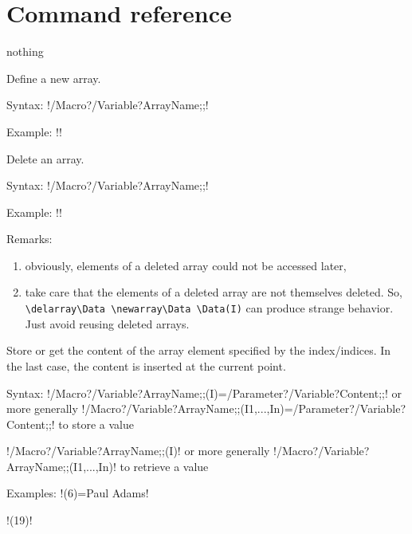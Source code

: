 \documentclass{article}
\newenvironment{Description}[1]{%
\begin{list}{nothing}{\setlength{\leftmargin}{#1}
\setlength{\labelwidth}{\leftmargin}\setlength{\labelsep}{1mm}}}
{\end{list}}
\newcommand{\BS}{\texttt{\symbol{`\\}}}
\newcommand{\Macro}[1]{\texttt{\BS#1}}
\newcommand{\FormatTeXMacro}[1]{\Macro{#1}\hfill :}
\begin{document}
\section{Command reference}

\begin{Description}{4cm}
  \item[\FormatTeXMacro{newarray}] Define a new array.

       Syntax: !\newarray/Macro?/Variable?ArrayName;;!

       Example: !\newarray\Values!

  \item[\FormatTeXMacro{delarray}] Delete an array.

       Syntax: !\delarray/Macro?/Variable?ArrayName;;!

       Example: !\delarray\Values!

       Remarks:
       \begin{enumerate}
         \item obviously, elements of a deleted array could not be accessed
         later,
         \item take care that the elements of a deleted array are not
         themselves deleted.\newline
         So, \verb+\delarray\Data \newarray\Data \Data(I)+ can produce 
         strange behavior. Just avoid  reusing deleted arrays.
       \end{enumerate}

  \item[\FormatTeXMacro{ArrayName}] Store or get the content of the array
  element specified by the index/indices. In the last case, the content is
  inserted at the current point.

       Syntax: !/Macro?/Variable?ArrayName;;(I)=/Parameter?/Variable?Content;;! or more
               generally\newline
               \hspace*{1.3cm}!/Macro?/Variable?ArrayName;;(I1,...,In)=/Parameter?/Variable?Content;;!
               to store a value

               \hspace{1.3cm}!/Macro?/Variable?ArrayName;;(I)! or more generally
               !/Macro?/Variable?ArrayName;;(I1,...,In)! to retrieve a value

       Examples: !\Data(6)={Paul Adams}!

                 \hspace{1.75cm}!\Values(19)!


\end{Description}
\end{document}
